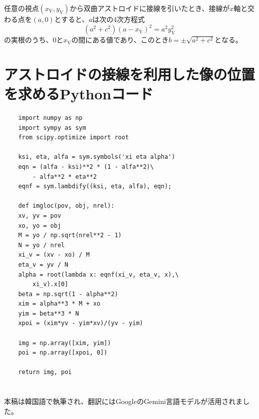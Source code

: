 \documentclass[twocolumn]{article}
\begin{document}
任意の視点$(x_{\mathrm{V}}, y_{\mathrm{V}})$から双曲アストロイドに接線を引いたとき、接線が$x$軸と交わる点を$(a,0)$とすると、$a$は次の4次方程式
$$ \left( a^2 + c^2 \right) \left(a - x_{\mathrm{V}} \right)^2 = a^2 y_{\mathrm{V}}^2$$
の実根のうち、$0$と$x_{\mathrm{V}}$の間にある値であり、このとき$b = \pm \sqrt{a^2 + c^2}$となる。

\section{アストロイドの接線を利用した像の位置を求めるPythonコード} \label{app:python}
\begin{verbatim}
	import numpy as np
	import sympy as sym
	from scipy.optimize import root
	
	ksi, eta, alfa = sym.symbols('xi eta alpha')
	eqn = (alfa - ksi)**2 * (1 - alfa**2)\
	    - alfa**2 * eta**2
	eqnf = sym.lambdify((ksi, eta, alfa), eqn);
	
	def imgloc(pov, obj, nrel):
	xv, yv = pov
	xo, yo = obj
	M = yo / np.sqrt(nrel**2 - 1)
	N = yo / nrel
	xi_v = (xv - xo) / M
	eta_v = yv / N
	alpha = root(lambda x: eqnf(xi_v, eta_v, x),\
	    xi_v).x[0]
	beta = np.sqrt(1 - alpha**2)
	xim = alpha**3 * M + xo
	yim = beta**3 * N
	xpoi = (xim*yv - yim*xv)/(yv - yim)
	
	img = np.array([xim, yim])
	poi = np.array([xpoi, 0])
	
	return img, poi
\end{verbatim}

\section*{}
\vfill
	

\noindent
本稿は韓国語で執筆され、翻訳にはGoogleのGemini言語モデルが活用されました。
%	
%	
	
\end{document}
